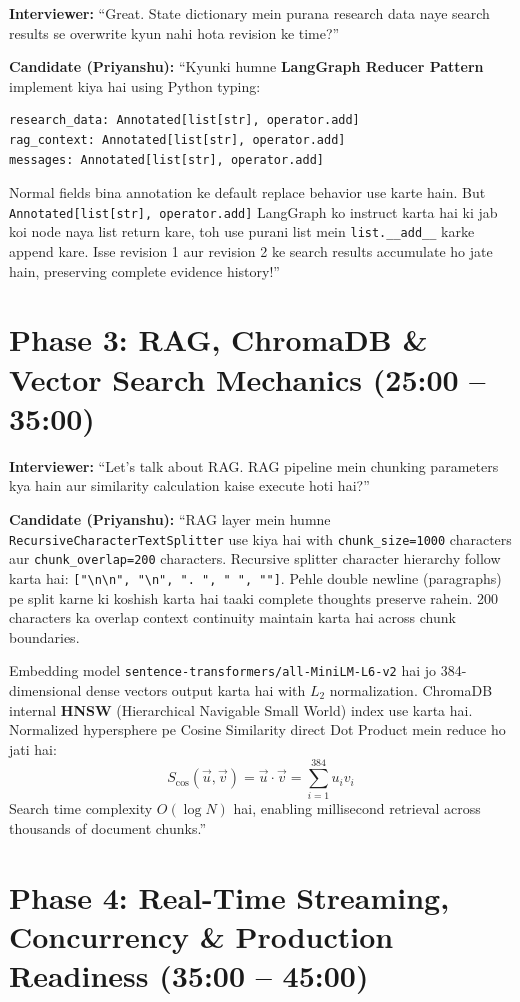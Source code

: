 \documentclass[11pt,a4paper,twoside]{report}
\begin{document}
\textbf{Interviewer:} ``Great. State dictionary mein purana research data naye search results se overwrite kyun nahi hota revision ke time?''

\textbf{Candidate (Priyanshu):} ``Kyunki humne \textbf{LangGraph Reducer Pattern} implement kiya hai using Python typing:
\begin{lstlisting}[style=pythonstyle]
research_data: Annotated[list[str], operator.add]
rag_context: Annotated[list[str], operator.add]
messages: Annotated[list[str], operator.add]
\end{lstlisting}
Normal fields bina annotation ke default replace behavior use karte hain. But \texttt{Annotated[list[str], operator.add]} LangGraph ko instruct karta hai ki jab koi node naya list return kare, toh use purani list mein \texttt{list.\_\_add\_\_} karke append kare. Isse revision 1 aur revision 2 ke search results accumulate ho jate hain, preserving complete evidence history!''

\section{Phase 3: RAG, ChromaDB \& Vector Search Mechanics (25:00 -- 35:00)}

\textbf{Interviewer:} ``Let's talk about RAG. RAG pipeline mein chunking parameters kya hain aur similarity calculation kaise execute hoti hai?''

\textbf{Candidate (Priyanshu):} ``RAG layer mein humne \texttt{RecursiveCharacterTextSplitter} use kiya hai with \texttt{chunk\_size=1000} characters aur \texttt{chunk\_overlap=200} characters.
Recursive splitter character hierarchy follow karta hai:
\texttt{["\textbackslash n\textbackslash n", "\textbackslash n", ". ", " ", ""]}.
Pehle double newline (paragraphs) pe split karne ki koshish karta hai taaki complete thoughts preserve rahein. 200 characters ka overlap context continuity maintain karta hai across chunk boundaries.

Embedding model \texttt{sentence-transformers/all-MiniLM-L6-v2} hai jo 384-dimensional dense vectors output karta hai with $L_2$ normalization.
ChromaDB internal \textbf{HNSW} (Hierarchical Navigable Small World) index use karta hai. Normalized hypersphere pe Cosine Similarity direct Dot Product mein reduce ho jati hai:
$$S_{\cos}(\vec{u}, \vec{v}) = \vec{u} \cdot \vec{v} = \sum_{i=1}^{384} u_i v_i$$
Search time complexity $O(\log N)$ hai, enabling millisecond retrieval across thousands of document chunks.''

\section{Phase 4: Real-Time Streaming, Concurrency \& Production Readiness (35:00 -- 45:00)}
\end{document}
